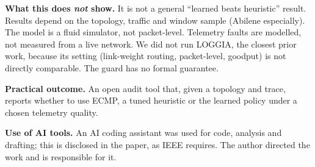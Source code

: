 \documentclass[10pt]{article}
\begin{document}
\textbf{What this does \emph{not} show.} It is not a general ``learned beats heuristic'' result. Results depend on the topology, traffic and window sample (Abilene especially). The model is a fluid simulator, not packet-level. Telemetry faults are modelled, not measured from a live network. We did not run LOGGIA, the closest prior work, because its setting (link-weight routing, packet-level, goodput) is not directly comparable. The guard has no formal guarantee.

\textbf{Practical outcome.} An open audit tool that, given a topology and trace, reports whether to use ECMP, a tuned heuristic or the learned policy under a chosen telemetry quality.

\textbf{Use of AI tools.} An AI coding assistant was used for code, analysis and drafting; this is disclosed in the paper, as IEEE requires. The author directed the work and is responsible for it.
\end{document}
